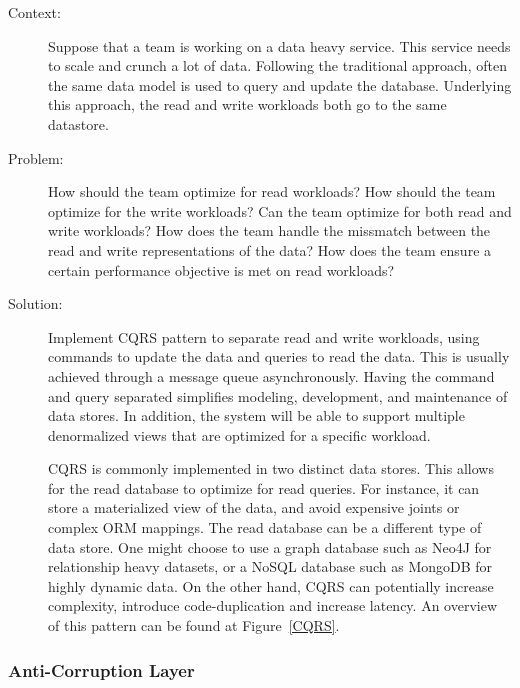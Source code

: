 \documentclass{bmcart}
\begin{document}
\begin{description}
  \item[Context:] Suppose that a team is working on a data heavy service. This service needs to scale and crunch a lot of data. Following the traditional approach, often the same data model is used to query and update the database. Underlying this approach, the read and write workloads both go to the same datastore. 
  \item[Problem:] How should the team optimize for read workloads? How should the team optimize for the write workloads? Can the team optimize for both read and write workloads? How does the team handle the missmatch between the read and write representations of the data? How does the team ensure a certain performance objective is met on read workloads?
  \item[Solution:] Implement CQRS pattern to separate read and write workloads, using commands to update the data and queries to read the data. This is usually achieved through a message queue asynchronously. Having the command and query separated simplifies modeling, development, and maintenance of data stores. In addition, the system will be able to support multiple denormalized views that are optimized for a specific workload. 

  CQRS is commonly implemented in two distinct data stores. This allows for the read database to optimize for read queries. For instance, it can store a materialized view of the data, and avoid expensive joints or complex ORM mappings. The read database can be a different type of data store. One might choose to use a graph database such as Neo4J for relationship heavy datasets, or a NoSQL database such as MongoDB for highly dynamic data. On the other hand, CQRS can potentially increase complexity, introduce code-duplication and increase latency. An overview of this pattern can be found at Figure~\ref{CQRS}.   
\end{description}


\subsubsection{Anti-Corruption Layer}
\end{document}
